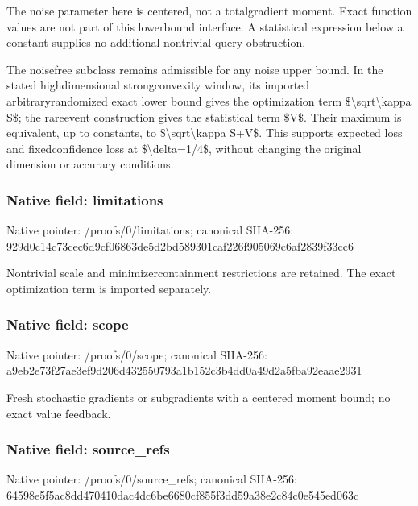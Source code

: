 \documentclass[10pt,a4paper]{article}
\begin{document}
The noise parameter here is centered, not a totalgradient moment. Exact function values are not part of this lowerbound interface. A statistical expression below a constant supplies no additional nontrivial query obstruction.

The noisefree subclass remains admissible for any noise upper bound. In the stated highdimensional strongconvexity window, its imported arbitraryrandomized exact lower bound gives the optimization term \$\textbackslash{}sqrt\textbackslash{}kappa S\$; the rareevent construction gives the statistical term \$V\$. Their maximum is equivalent, up to constants, to \$\textbackslash{}sqrt\textbackslash{}kappa S+V\$. This supports expected loss and fixedconfidence loss at \$\textbackslash{}delta=1/4\$, without changing the original dimension or accuracy conditions.


\subsubsection{Native field: limitations}


Native pointer: /proofs/0/limitations; canonical SHA-256: 929d0c14c73cec6d9cf06863\allowbreak{}de5d2bd589301caf226f9050\allowbreak{}69c6af2839f33cc6


Nontrivial scale and minimizercontainment restrictions are retained. The exact optimization term is imported separately.


\subsubsection{Native field: scope}


Native pointer: /proofs/0/scope; canonical SHA-256: a9eb2e73f27ae3ef9d206d43\allowbreak{}2550793a1b152c3b4dd0a49d\allowbreak{}2a5fba92eaae2931


Fresh stochastic gradients or subgradients with a centered moment bound; no exact value feedback.


\subsubsection{Native field: source\_refs}


Native pointer: /proofs/0/source\_refs; canonical SHA-256: 64598e5f5ac8dd470410dac4\allowbreak{}dc6be6680cf855f3dd59a38e\allowbreak{}2c84c0e545ed063c
\end{document}
